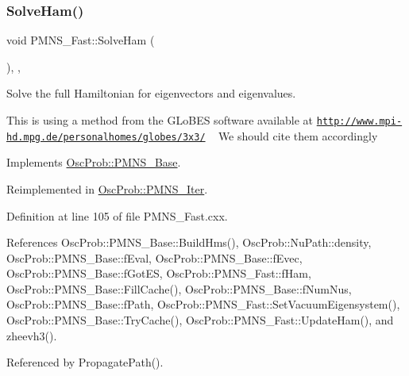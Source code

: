 \subsubsection{\texorpdfstring{Solve\+Ham()}{SolveHam()}}
{\footnotesize\ttfamily void P\+M\+N\+S\+\_\+\+Fast\+::\+Solve\+Ham (\begin{DoxyParamCaption}{ }\end{DoxyParamCaption})\hspace{0.3cm}{\ttfamily [protected]}, {\ttfamily [virtual]}, {\ttfamily [inherited]}}

Solve the full Hamiltonian for eigenvectors and eigenvalues.

This is using a method from the G\+Lo\+B\+ES software available at \href{http://www.mpi-hd.mpg.de/personalhomes/globes/3x3/}{\tt http\+://www.\+mpi-\/hd.\+mpg.\+de/personalhomes/globes/3x3/} ~\newline
We should cite them accordingly 

Implements \hyperlink{classOscProb_1_1PMNS__Base_a91f065cb9e910e0095e41462b4420b01}{Osc\+Prob\+::\+P\+M\+N\+S\+\_\+\+Base}.



Reimplemented in \hyperlink{classOscProb_1_1PMNS__Iter_a0a4a4af377f11e8d4c681c17ced7c9e9}{Osc\+Prob\+::\+P\+M\+N\+S\+\_\+\+Iter}.



Definition at line 105 of file P\+M\+N\+S\+\_\+\+Fast.\+cxx.



References Osc\+Prob\+::\+P\+M\+N\+S\+\_\+\+Base\+::\+Build\+Hms(), Osc\+Prob\+::\+Nu\+Path\+::density, Osc\+Prob\+::\+P\+M\+N\+S\+\_\+\+Base\+::f\+Eval, Osc\+Prob\+::\+P\+M\+N\+S\+\_\+\+Base\+::f\+Evec, Osc\+Prob\+::\+P\+M\+N\+S\+\_\+\+Base\+::f\+Got\+ES, Osc\+Prob\+::\+P\+M\+N\+S\+\_\+\+Fast\+::f\+Ham, Osc\+Prob\+::\+P\+M\+N\+S\+\_\+\+Base\+::\+Fill\+Cache(), Osc\+Prob\+::\+P\+M\+N\+S\+\_\+\+Base\+::f\+Num\+Nus, Osc\+Prob\+::\+P\+M\+N\+S\+\_\+\+Base\+::f\+Path, Osc\+Prob\+::\+P\+M\+N\+S\+\_\+\+Fast\+::\+Set\+Vacuum\+Eigensystem(), Osc\+Prob\+::\+P\+M\+N\+S\+\_\+\+Base\+::\+Try\+Cache(), Osc\+Prob\+::\+P\+M\+N\+S\+\_\+\+Fast\+::\+Update\+Ham(), and zheevh3().



Referenced by Propagate\+Path().



